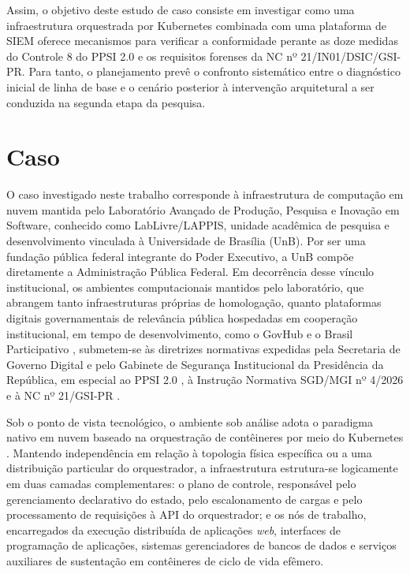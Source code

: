 Assim, o objetivo deste estudo de caso consiste em investigar como uma infraestrutura orquestrada por Kubernetes combinada com uma plataforma de SIEM oferece mecanismos para verificar a conformidade perante as doze medidas do Controle 8 do PPSI 2.0 e os requisitos forenses da NC nº 21/IN01/DSIC/GSI-PR. Para tanto, o planejamento prevê o confronto sistemático entre o diagnóstico inicial de linha de base e o cenário posterior à intervenção arquitetural a ser conduzida na segunda etapa da pesquisa.

\section{Caso}
\label{sec:ec_caso}

O caso investigado neste trabalho corresponde à infraestrutura de computação em nuvem mantida pelo Laboratório Avançado de Produção, Pesquisa e Inovação em Software, conhecido como LabLivre/LAPPIS, unidade acadêmica de pesquisa e desenvolvimento vinculada à Universidade de Brasília (UnB). Por ser uma fundação pública federal integrante do Poder Executivo, a UnB compõe diretamente a Administração Pública Federal. Em decorrência desse vínculo institucional, os ambientes computacionais mantidos pelo laboratório, que abrangem tanto infraestruturas próprias de homologação, quanto plataformas digitais governamentais de relevância pública hospedadas em cooperação institucional, em tempo de desenvolvimento, como o GovHub e o Brasil Participativo \cite{brasilparticipativo2025}, submetem-se às diretrizes normativas expedidas pela Secretaria de Governo Digital e pelo Gabinete de Segurança Institucional da Presidência da República, em especial ao PPSI 2.0 \cite{portaria9511_2025,ppsi2026}, à Instrução Normativa SGD/MGI nº 4/2026 \cite{in4_2026} e à NC nº 21/GSI-PR \cite{nc21_2014}.

Sob o ponto de vista tecnológico, o ambiente sob análise adota o paradigma nativo em nuvem baseado na orquestração de contêineres por meio do Kubernetes \cite{cncf2024,kubernetes2025}. Mantendo independência em relação à topologia física específica ou a uma distribuição particular do orquestrador, a infraestrutura estrutura-se logicamente em duas camadas complementares: o plano de controle, responsável pelo gerenciamento declarativo do estado, pelo escalonamento de cargas e pelo processamento de requisições à API do orquestrador; e os nós de trabalho, encarregados da execução distribuída de aplicações \textit{web}, interfaces de programação de aplicações, sistemas gerenciadores de bancos de dados e serviços auxiliares de sustentação em contêineres de ciclo de vida efêmero.

